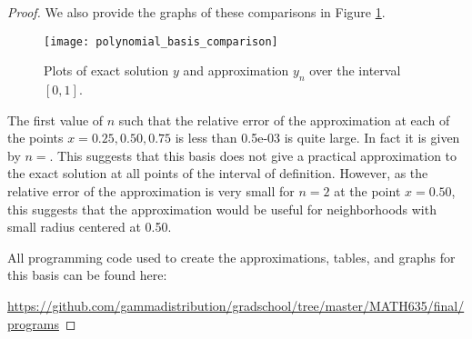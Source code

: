 \begin{proof}
  We also provide the graphs of these comparisons in Figure \ref{poly_plot}.

  \begin{figure}[h!]
    \begin{center}
      \texttt{[image: polynomial\_basis\_comparison]}
    \end{center}
    \caption{Plots of exact solution $y$ and approximation $y_n$ over the interval $[0, 1]$.}\label{poly_plot}
  \end{figure}

  The first value of $n$ such that the relative error of the approximation at
  each of the points $x=0.25, 0.50, 0.75$ is less than 0.5e-03 is quite large. In fact
  it is given by $n=$. This suggests that this basis does not give a practical
  approximation to the exact solution at all points of the interval of definition.
  However, as the relative error of the approximation is very small for $n=2$
  at the point $x=0.50$, this suggests that the approximation would be useful
  for neighborhoods with small radius centered at 0.50.

  All programming code used to create the approximations, tables, and graphs
  for this basis can be found here:

  \url{https://github.com/gammadistribution/gradschool/tree/master/MATH635/final/programs}
\end{proof}